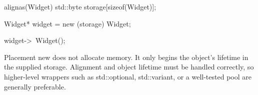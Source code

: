 \documentclass{report}
\begin{document}
\begin{itemize}
\begin{cppcode}
                alignas(Widget) std::byte storage[sizeof(Widget)];

                Widget* widget = new (storage) Widget{};

                widget->~Widget();
            \end{cppcode}
            \bigbreak \noindent 
            Placement new does not allocate memory. It only begins the object’s lifetime in the supplied storage.
            \bigbreak \noindent 
            Alignment and object lifetime must be handled correctly, so higher-level wrappers such as std::optional, std::variant, or a well-tested pool are generally preferable.



    \end{itemize}

    \pagebreak 
\end{document}

